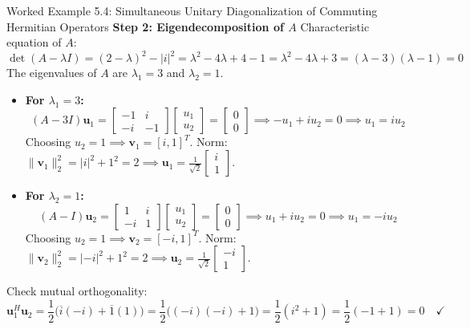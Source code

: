 \begin{examplebox}{Worked Example 5.4: Simultaneous Unitary Diagonalization of Commuting Hermitian Operators}
\textbf{Step 2: Eigendecomposition of $A$}
Characteristic equation of $A$:
\begin{equation*}
\det(A - \lambda I) = (2 - \lambda)^2 - |i|^2 = \lambda^2 - 4\lambda + 4 - 1 = \lambda^2 - 4\lambda + 3 = (\lambda - 3)(\lambda - 1) = 0
\end{equation*}
The eigenvalues of $A$ are $\lambda_1 = 3$ and $\lambda_2 = 1$.
\begin{itemize}
    \item \textbf{For $\lambda_1 = 3$:}
    \begin{equation*}
    (A - 3I)\mathbf{u}_1 = \begin{bmatrix} -1 & i \\ -i & -1 \end{bmatrix}\begin{bmatrix} u_1 \\ u_2 \end{bmatrix} = \begin{bmatrix} 0 \\ 0 \end{bmatrix} \implies -u_1 + i u_2 = 0 \implies u_1 = i u_2
    \end{equation*}
    Choosing $u_2 = 1 \implies \mathbf{v}_1 = [i, 1]^T$. Norm: $\|\mathbf{v}_1\|_2^2 = |i|^2 + 1^2 = 2 \implies \mathbf{u}_1 = \frac{1}{\sqrt{2}}\begin{bmatrix} i \\ 1 \end{bmatrix}$.

    \item \textbf{For $\lambda_2 = 1$:}
    \begin{equation*}
    (A - I)\mathbf{u}_2 = \begin{bmatrix} 1 & i \\ -i & 1 \end{bmatrix}\begin{bmatrix} u_1 \\ u_2 \end{bmatrix} = \begin{bmatrix} 0 \\ 0 \end{bmatrix} \implies u_1 + i u_2 = 0 \implies u_1 = -i u_2
    \end{equation*}
    Choosing $u_2 = 1 \implies \mathbf{v}_2 = [-i, 1]^T$. Norm: $\|\mathbf{v}_2\|_2^2 = |-i|^2 + 1^2 = 2 \implies \mathbf{u}_2 = \frac{1}{\sqrt{2}}\begin{bmatrix} -i \\ 1 \end{bmatrix}$.
\end{itemize}
Check mutual orthogonality:
\begin{equation*}
\mathbf{u}_1^H \mathbf{u}_2 = \frac{1}{2}\big( \overline{i}(-i) + \overline{1}(1) \big) = \frac{1}{2}\big( (-i)(-i) + 1 \big) = \frac{1}{2}(i^2 + 1) = \frac{1}{2}(-1 + 1) = 0 \quad \checkmark
\end{equation*}


\end{examplebox}

